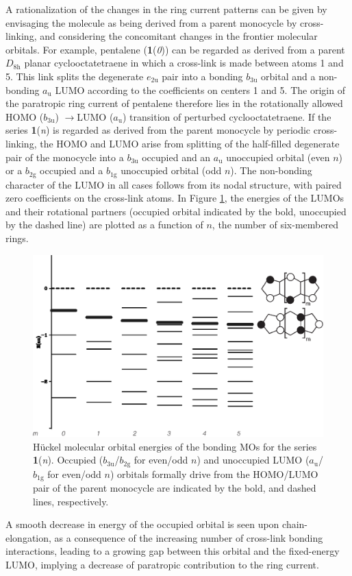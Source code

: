 A rationalization of the changes in the ring current patterns can be given by envisaging the molecule as being derived from a parent monocycle by cross-linking, and considering the concomitant changes in the frontier molecular orbitals. For example, pentalene (\textbf{1}(\textit{0})) can be regarded as derived from a parent $D_\mathrm{8h}$ planar cyclooctatetraene in which a cross-link is made between atoms 1 and 5. This link splits the degenerate $e_\mathrm{2u}$ pair into a bonding $b_\mathrm{3u}$ orbital and a non-bonding $a_\mathrm{u}$ LUMO according to the coefficients on centers 1 and 5. The origin of the paratropic ring current of pentalene therefore lies in the rotationally allowed HOMO ($b_\mathrm{3u}$) $\rightarrow$LUMO ($a_\mathrm{u}$) transition   \cite{r05,r35,r36} of perturbed cyclooctatetraene. If the series \textbf{1}(\textit{n}) is regarded as derived from the parent monocycle by periodic cross-linking, the HOMO and LUMO arise from splitting of the half-filled degenerate pair of the monocycle into a $b_\mathrm{3u}$ occupied and an $a_\mathrm{u}$ unoccupied orbital (even $n$) or a $b_\mathrm{2g}$ occupied and a $b_\mathrm{1g}$ unoccupied orbital (odd $n$). The non-bonding character of the LUMO in all cases follows from its nodal structure, with paired zero coefficients on the cross-link atoms. In Figure \ref{ch7.fig05}, the energies of the LUMOs and their rotational partners (occupied orbital indicated by the bold, unoccupied by the dashed line) are plotted as a function of $n$, the number of six-membered rings.
\begin{figure}
\center
\includegraphics[width=5.5in]{indacene/figures/figure5.eps}
\caption{H\"uckel molecular orbital energies of the bonding MOs for the series \textbf{1}(\textit{n}). Occupied ($b_\mathrm{3u}$/$b_\mathrm{2g}$ for even/odd $n$) and unoccupied LUMO ($a_\mathrm{u}$/$b_\mathrm{1g}$ for even/odd $n$) orbitals formally drive from the HOMO/LUMO pair of the parent monocycle are indicated by the bold, and dashed lines, respectively.}
\label{ch7.fig05}
\end{figure}
A smooth decrease in energy of the occupied orbital is seen upon chain-elongation, as a consequence of the increasing number of cross-link bonding interactions, leading to a growing gap between this orbital and the fixed-energy LUMO, implying a decrease of paratropic contribution to the ring current.

